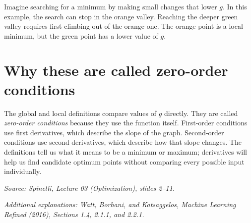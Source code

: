 \documentclass[a4paper,12pt,oneside]{report}
\begin{document}
Imagine searching for a minimum by making small changes that lower
$g$. In this example, the search can stop in the orange valley.
Reaching the deeper green valley requires first climbing out of the
orange one. The orange point is a local minimum, but the green point
has a lower value of $g$.

\section{Why these are called zero-order conditions}

The global and local definitions compare values of $g$ directly.
They are called \emph{zero-order conditions} because they use the
function itself. First-order conditions use first derivatives, which
describe the slope of the graph. Second-order conditions use second
derivatives, which describe how that slope changes. The definitions
tell us what it means to be a minimum or maximum; derivatives will
help us find candidate optimum points without comparing every
possible input individually.

\medskip
{\small\textit{Source: Spinelli, Lecture 03 (Optimization), slides 2--11.}}
\par\smallskip
{\small\textit{Additional explanations: Watt, Borhani, and Katsaggelos,
Machine Learning Refined (2016), Sections 1.4, 2.1.1, and 2.2.1.}}
\end{document}

